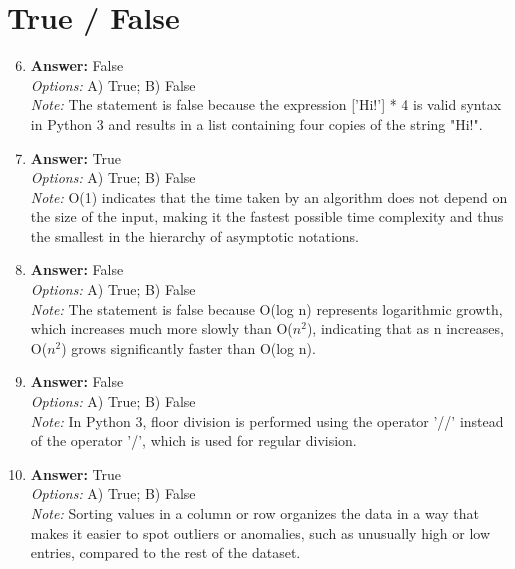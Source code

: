 \documentclass[12pt]{article}
\begin{document}
\section*{True / False}
\begin{enumerate}[label=\arabic*.]
\setcounter{enumi}{5}
\item \textbf{Answer:} False
\\ \textit{Options:} A) True; B) False
\\ \textit{Note:} The statement is false because the expression ['Hi!'] * 4 is valid syntax in Python 3 and results in a list containing four copies of the string "Hi!".
\item \textbf{Answer:} True
\\ \textit{Options:} A) True; B) False
\\ \textit{Note:} O(1) indicates that the time taken by an algorithm does not depend on the size of the input, making it the fastest possible time complexity and thus the smallest in the hierarchy of asymptotic notations.
\item \textbf{Answer:} False
\\ \textit{Options:} A) True; B) False
\\ \textit{Note:} The statement is false because O(log n) represents logarithmic growth, which increases much more slowly than O($n^2$), indicating that as n increases, O($n^2$) grows significantly faster than O(log n).
\item \textbf{Answer:} False
\\ \textit{Options:} A) True; B) False
\\ \textit{Note:} In Python 3, floor division is performed using the operator '//' instead of the operator '/', which is used for regular division.
\item \textbf{Answer:} True
\\ \textit{Options:} A) True; B) False
\\ \textit{Note:} Sorting values in a column or row organizes the data in a way that makes it easier to spot outliers or anomalies, such as unusually high or low entries, compared to the rest of the dataset.
\end{enumerate}
\end{document}
